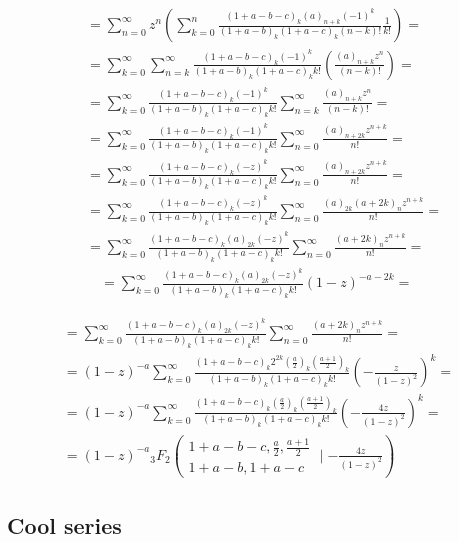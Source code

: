 	$$
	\begin{aligned}
		& =\sum_{n=0}^{\infty} z^n\left(\sum_{k=0}^n \frac{(1+a-b-c)_k(a)_{n+k}(-1)^k}{(1+a-b)_k(1+a-c)_k(n-k) !} \frac{1}{k !}\right)= \\
		& =\sum_{k=0}^{\infty} \sum_{n=k}^{\infty} \frac{(1+a-b-c)_k(-1)^k}{(1+a-b)_k(1+a-c)_k k !}\left(\frac{(a)_{n+k} z^n}{(n-k) !}\right)= \\
		& =\sum_{k=0}^{\infty} \frac{(1+a-b-c)_k(-1)^k}{(1+a-b)_k(1+a-c)_k k !} \sum_{n=k}^{\infty} \frac{(a)_{n+k} z^n}{(n-k) !}= \\
		& =\sum_{k=0}^{\infty} \frac{(1+a-b-c)_k(-1)^k}{(1+a-b)_k(1+a-c)_k k !} \sum_{n=0}^{\infty} \frac{(a)_{n+2 k} z^{n+k}}{n !}= \\
		& =\sum_{k=0}^{\infty} \frac{(1+a-b-c)_k(-z)^k}{(1+a-b)_k(1+a-c)_k k !} \sum_{n=0}^{\infty} \frac{(a)_{n+2 k} z^{n+k}}{n !}= \\
		& =\sum_{k=0}^{\infty} \frac{(1+a-b-c)_k(-z)^k}{(1+a-b)_k(1+a-c)_k k !} \sum_{n=0}^{\infty} \frac{(a)_{2 k}(a+2 k)_n z^{n+k}}{n !}= \\
		& =\sum_{k=0}^{\infty} \frac{(1+a-b-c)_k(a)_{2 k}(-z)^k}{(1+a-b)_k(1+a-c)_k k !} \sum_{n=0}^{\infty} \frac{(a+2 k)_n z^{n+k}}{n !}= \\
		& \quad=\sum_{k=0}^{\infty} \frac{(1+a-b-c)_k(a)_{2 k}(-z)^k}{(1+a-b)_k(1+a-c)_k k !}(1-z)^{-a-2 k}=
	\end{aligned}
	$$
	
	$$
	\begin{gathered}
		=\sum_{k=0}^{\infty} \frac{(1+a-b-c)_k(a)_{2 k}(-z)^k}{(1+a-b)_k(1+a-c)_k k !} \sum_{n=0}^{\infty} \frac{(a+2 k)_n z^{n+k}}{n !}= \\
		=(1-z)^{-a} \sum_{k=0}^{\infty} \frac{(1+a-b-c)_k 2^{2 k}\left(\frac{a}{2}\right)_k\left(\frac{a+1}{2}\right)_k}{(1+a-b)_k(1+a-c)_k k !}\left(-\frac{z}{(1-z)^2}\right)^k= \\
		=(1-z)^{-a} \sum_{k=0}^{\infty} \frac{(1+a-b-c)_k\left(\frac{a}{2}\right)_k\left(\frac{a+1}{2}\right)_k}{(1+a-b)_k(1+a-c)_k k !}\left(-\frac{4 z}{(1-z)^2}\right)^k= \\
		=(1-z)^{-a}{ }_3 F_2\left(\begin{array}{c}
			1+a-b-c, \frac{a}{2}, \frac{a+1}{2} \\
			1+a-b, 1+a-c
		\end{array} \mid-\frac{4 z}{(1-z)^2}\right)
	\end{gathered}
	$$
	
	\subsection{Cool series}
	
